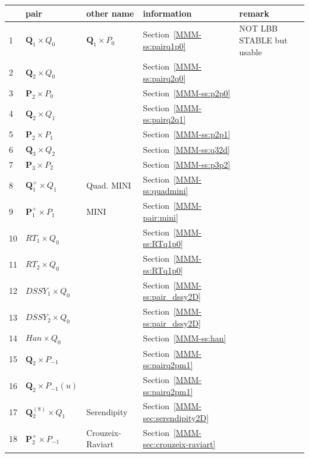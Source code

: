 \begin{center}
\begin{tabular}{p{1cm}p{2cm}p{3.5cm}p{2.25cm}p{5cm}}
\hline
 &pair & other name & information & remark \\
\hline
\hline
 1&${\bm Q}_1\times Q_0$       & ${\bm Q}_1\times P_0$       & Section~\ref{MMM-ss:pairq1p0} & NOT LBB STABLE but usable\\
 2&${\bm Q}_2\times Q_0$       &                             & Section~\ref{MMM-ss:pairq2q0}\\
 3&${\bm P}_2\times P_0$       &                             & Section~\ref{MMM-ss:p2p0}\\ 
 4&${\bm Q}_2\times Q_1$       &                             & Section~\ref{MMM-ss:pairq2q1}\\
 5&${\bm P}_2\times P_1$       &                             & Section~\ref{MMM-ss:p2p1}\\
 6&${\bm Q}_3\times Q_2$       &                             & Section~\ref{MMM-ss:q32d}\\
 7&${\bm P}_3\times P_2$       &                             & Section~\ref{MMM-ss:p3p2}\\
 8&${\bm Q}_1^+\times Q_1$     & Quad. MINI                  & Section~\ref{MMM-ss:quadmini}\\
 9&${\bm P}_1^+\times P_1$     & MINI                        & Section~\ref{MMM-pair:mini}\\
10&$RT_1\times Q_0$            &                             & Section~\ref{MMM-ss:RTq1p0}\\
11&$RT_2\times Q_0$            &                             & Section~\ref{MMM-ss:RTq1p0}\\
12&$DSSY_1\times Q_0$          &                             & Section~\ref{MMM-ss:pair_dssy2D}\\
13&$DSSY_2\times Q_0$          &                             & Section~\ref{MMM-ss:pair_dssy2D}\\
14&$Han\times Q_0$             &                             & Section~\ref{MMM-ss:han}\\
15&${\bm Q}_2\times P_{-1}$    &                             & Section~\ref{MMM-ss:pairq2pm1}\\
16&${\bm Q}_2\times P_{-1}(u)$ &                             & Section~\ref{MMM-ss:pairq2pm1}\\
17&${\bm Q}_2^{(8)}\times Q_1$ & Serendipity                 & Section~\ref{MMM-sec:serendipity2D}\\
18&${\bm P}_2^+\times P_{-1}$  & Crouzeix-Raviart            & Section~\ref{MMM-sec:crouzeix-raviart}\\

\end{tabular}
\end{center}
